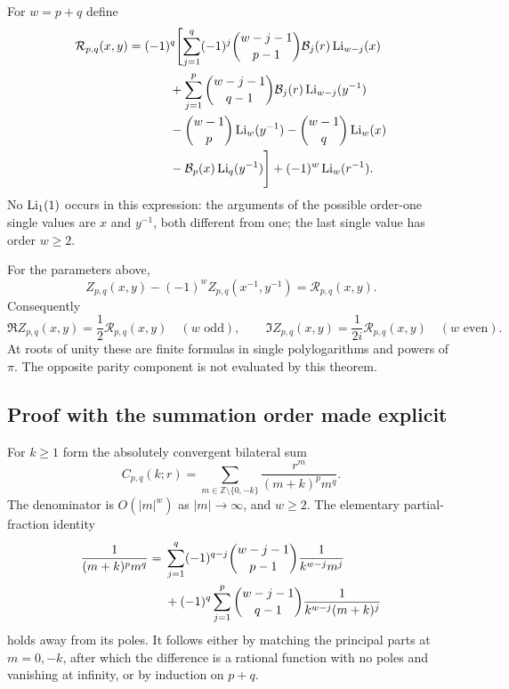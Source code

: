 For $w=p+q$ define
\begin{align}
 \mathcal R_{p,q}(x,y)={}&(-1)^q\Biggl[
 \sum_{j=1}^q(-1)^j\binom{w-j-1}{p-1}
       \mathcal B_j(r)\operatorname{Li}_{w-j}(x)\notag\\
 &\qquad+\sum_{j=1}^p\binom{w-j-1}{q-1}
       \mathcal B_j(r)\operatorname{Li}_{w-j}(y^{-1})\notag\\
 &\qquad-\binom{w-1}{p}\operatorname{Li}_w(y^{-1})
       -\binom{w-1}{q}\operatorname{Li}_w(x)
       \notag\\
 &\qquad-\mathcal B_p(x)\operatorname{Li}_q(y^{-1})\Biggr]
       +(-1)^w\operatorname{Li}_w(r^{-1}).
 \label{bip:eq:R}
\end{align}
No $\operatorname{Li}_1(1)$ occurs in this expression: the arguments of the possible
order-one single values are $x$ and $y^{-1}$, both different from one;
the last single value has order $w\ge2$.

\begin{theorem}
\label{bip:thm:parity}
For the parameters above,
\begin{equation}
 \boxed{\quad Z_{p,q}(x,y)-(-1)^wZ_{p,q}(x^{-1},y^{-1})
      =\mathcal R_{p,q}(x,y).\quad}
 \label{bip:eq:parity}
\end{equation}
Consequently
\[
 \Re Z_{p,q}(x,y)=\frac12\mathcal R_{p,q}(x,y)
       \quad(w\text{ odd}),
 \qquad
 \Im Z_{p,q}(x,y)=\frac1{2i}\mathcal R_{p,q}(x,y)
       \quad(w\text{ even}).
\]
At roots of unity these are finite formulas in single polylogarithms
and powers of $\pi$.  The opposite parity component is not evaluated
by this theorem.
\end{theorem}

\subsection{Proof with the summation order made explicit}
For $k\ge1$ form the absolutely convergent bilateral sum
\[
 C_{p,q}(k;r)=\sum_{m\in\mathbb Z\setminus\{0,-k\}}
       \frac{r^m}{(m+k)^pm^q}.
\]
The denominator is $O(|m|^w)$ as $|m|\to\infty$, and $w\ge2$.
The elementary partial-fraction identity
\begin{align}
 \frac1{(m+k)^pm^q}
 ={}&\sum_{j=1}^q(-1)^{q-j}\binom{w-j-1}{p-1}
       \frac1{k^{w-j}m^j}\notag\\
 &+(-1)^q\sum_{j=1}^p\binom{w-j-1}{q-1}
       \frac1{k^{w-j}(m+k)^j}
 \label{bip:eq:pf}
\end{align}
holds away from its poles.  It follows either by matching the principal
parts at $m=0,-k$, after which the difference is a rational function
with no poles and vanishing at infinity, or by induction on $p+q$.

